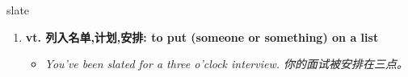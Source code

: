 
\begin{frame}
{\huge slate}
\begin{center}
\begin{enumerate}\Large
  \item \textbf{vt. 列入名单,计划,安排: to put (someone or something) on a list}
  \begin{itemize}
    \item \em{\Large{You've been slated for a three o'clock interview. 你的面试被安排在三点。}}
  \end{itemize}
\end{enumerate}
\end{center}
\end{frame}
